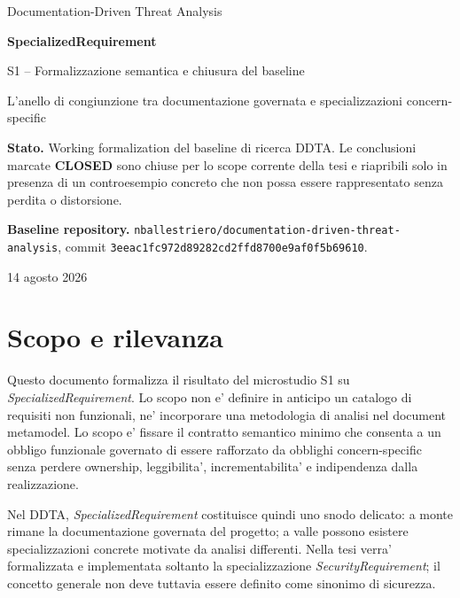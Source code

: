 \documentclass[11pt,a4paper]{article}
\newcommand{\closed}{\textbf{CLOSED}}
\begin{document}
\begin{titlepage}
\centering
\vspace*{2.2cm}
{\Large Documentation-Driven Threat Analysis\par}
\vspace{0.9cm}
{\Huge\bfseries SpecializedRequirement\par}
\vspace{0.35cm}
{\LARGE S1 -- Formalizzazione semantica e chiusura del baseline\par}
\vspace{1.0cm}
{\large L'anello di congiunzione tra documentazione governata e specializzazioni concern-specific\par}
\vfill
\begin{minipage}{0.82\textwidth}
\small
\textbf{Stato.} Working formalization del baseline di ricerca DDTA. Le conclusioni marcate \closed{} sono chiuse per lo scope corrente della tesi e riapribili solo in presenza di un controesempio concreto che non possa essere rappresentato senza perdita o distorsione.

\medskip
\textbf{Baseline repository.} \texttt{nballestriero/documentation-driven-threat-analysis}, commit \texttt{3eeac1fc972d89282cd2ffd8700e9af0f5b69610}.
\end{minipage}
\vfill
{\large 14 agosto 2026\par}
\end{titlepage}

\tableofcontents
\newpage

\section{Scopo e rilevanza}

Questo documento formalizza il risultato del microstudio S1 su \emph{SpecializedRequirement}. Lo scopo non e' definire in anticipo un catalogo di requisiti non funzionali, ne' incorporare una metodologia di analisi nel document metamodel. Lo scopo e' fissare il contratto semantico minimo che consenta a un obbligo funzionale governato di essere rafforzato da obblighi concern-specific senza perdere ownership, leggibilita', incrementabilita' e indipendenza dalla realizzazione.

Nel DDTA, \emph{SpecializedRequirement} costituisce quindi uno snodo delicato: a monte rimane la documentazione governata del progetto; a valle possono esistere specializzazioni concrete motivate da analisi differenti. Nella tesi verra' formalizzata e implementata soltanto la specializzazione \emph{SecurityRequirement}; il concetto generale non deve tuttavia essere definito come sinonimo di sicurezza.
\end{document}
